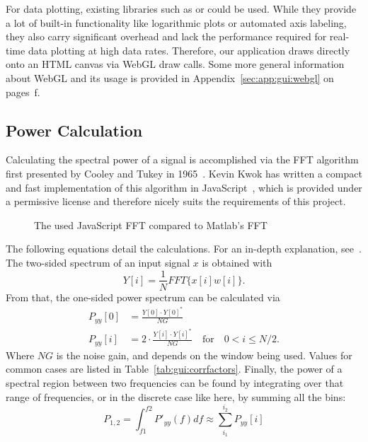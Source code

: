 For   data  plotting,   existing   libraries  such   as     or
  could  be   used. While  they  provide  a   lot  of  built-in
functionality like  logarithmic plots  or automated  axis labeling,  they also
carry significant  overhead and  lack the  performance required  for real-time
data plotting  at high data  rates. Therefore, our application  draws directly
onto an HTML canvas via WebGL draw calls.  Some more general information about
WebGL  and  its  usage  is  provided  in  Appendix~\ref{sec:app:gui:webgl}  on
pages~\pageref{sec:app:gui:webgl}f.
%
%
\subsection{Power Calculation} %
\label{subsec:gui:power_calculation}

Calculating  the spectral  power  of  a signal  is  accomplished  via the  FFT
algorithm first presented by Cooley and Tukey in 1965~\cite{fft:cooley:tukey}.
Kevin Kwok  has written a  compact and  fast implementation of  this algorithm
in  JavaScript~\cite{kwok},  which  is  provided under  a  permissive  license
\cite{kwok:license}  and  therefore  nicely  suits the  requirements  of  this
project.

\begin{figure}
    \centering
    
    \caption[FFT Comparison]{%
        The used JavaScript FFT compared to Matlab's FFT%
    }
    \label{fig:gui:fft_comparison}
\end{figure}

The following equations detail  the calculations. For an in-depth explanation,
see~\cite{gui:hanspi}.   The two-sided  spectrum  of an  input  signal $x$  is
obtained with
\begin{equation}
    Y[i] = \frac{1}{N}FFT\{x[i]w[i]\}.
    \label{eq:gui:onesidedf}
\end{equation}
From that, the one-sided power spectrum can be calculated via
\begin{align}
    P_{yy}[0] &= \frac{Y[0]\cdot Y[0]^*}{NG} \nonumber\\
    P_{yy}[i] &= 2\cdot\frac{Y[i]\cdot Y[i]^*}{NG} \quad \text{for} \quad 0 < i \leq N / 2.
    \label{eq:gui:onesidedp}
\end{align}
Where $NG$ is the noise gain, and depends on the window being used. Values for
common  cases are  listed  in  Table~\ref{tab:gui:corrfactors}.  Finally,  the
power of a spectral region between two frequencies can be found by integrating
over that range of frequencies, or in  the discrete case like here, by summing
all the bins:
\begin{equation}
    P_{1,2} = \int_{f1}^{f2} P'_{yy}(f)df \approx \sum_{i_1}^{i_2}P_{yy}[i]
    \label{eq:gui:power}
\end{equation}


